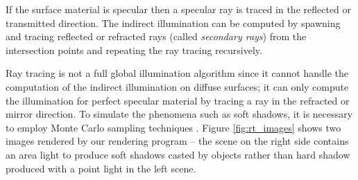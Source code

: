 If the surface material is specular then a specular ray is traced in the reflected or transmitted direction. The indirect illumination can be computed by spawning and tracing reflected or refracted rays (called \emph{secondary rays}) from the intersection points and repeating the ray tracing recursively.

Ray tracing is not a full global illumination algorithm since it cannot handle the computation of the indirect illumination on diffuse surfaces; it can only compute the illumination for perfect specular material by tracing a ray in the refracted or mirror direction. To simulate the phenomena such as soft shadows, it is necessary to employ Monte Carlo sampling techniques \cite{Kajiya:1986:RE:15922.15902}. Figure \ref{fig:rt_images} shows two images rendered by our rendering program -- the scene on the right side contains an area light to produce soft shadows casted by objects rather than hard shadow produced with a point light in the left scene.

